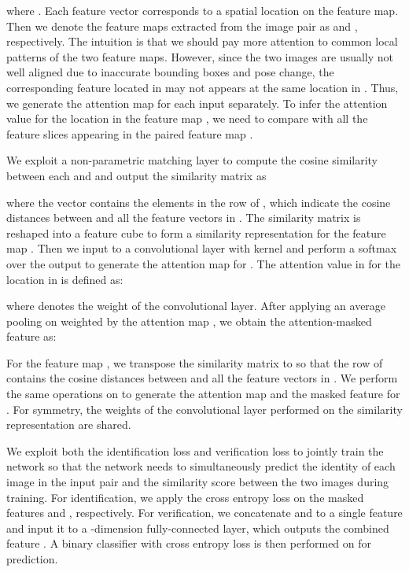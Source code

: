 \documentclass[runningheads]{llncs}
\begin{document}
  where . 
Each feature vector  corresponds to a spatial location on the feature map. 
Then we denote the feature maps extracted from the image pair as  and , respectively. 
The intuition is that we should pay more attention to common local patterns of the two feature maps. 
However, since the two images are usually not well aligned due to inaccurate bounding boxes and pose change, the corresponding feature located in  may not appears at the same location in . 
Thus, we generate the attention map for each input separately. To infer the attention value for the  location in the feature map , we need to compare  with all the feature slices appearing in the paired feature map . 
  
  We exploit a non-parametric matching layer to compute the cosine similarity  between each  and  and output the similarity matrix  as
  
  where the vector  contains the elements in the  row of , which indicate the cosine distances between  and all the feature vectors in . 
The similarity matrix  is reshaped into a  feature cube  to form a similarity representation for the feature map . 
Then we input  to a convolutional layer with  kernel and perform a softmax over the output to generate the attention map  for . 
The attention value  in  for the  location in  is defined as:
  
  where  denotes the weight of the  convolutional layer. After applying an average pooling on  weighted by the attention map , we obtain the attention-masked feature  as:
  
  
  For the feature map , we transpose the similarity matrix  to  so that the  row of  contains the cosine distances between  and all the feature vectors in . We perform the same operations on  to generate the attention map  and the masked feature  for . For symmetry, the weights of the  convolutional layer performed on the similarity representation  are shared.
  
  We exploit both the identification loss and verification loss to jointly train the network so that the network needs to simultaneously predict the identity of each image in the input pair and the similarity score between the two images during training. For identification, we apply the cross entropy loss on the masked features  and , respectively. For verification, we concatenate  and  to a single feature and input it to a -dimension fully-connected layer, which outputs the combined feature . A binary classifier with cross entropy loss is then performed on  for prediction. 
  
\end{document}
